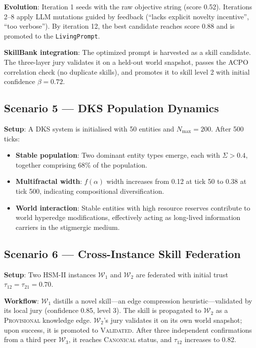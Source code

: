 \documentclass[11pt]{article}
\begin{document}
\noindent\textbf{Evolution}: Iteration 1 seeds with the raw objective string
(score 0.52). Iterations 2--8 apply LLM mutations guided by feedback
(``lacks explicit novelty incentive'', ``too verbose''). By iteration 12, the
best candidate reaches score 0.88 and is promoted to the \texttt{LivingPrompt}.

\noindent\textbf{SkillBank integration}: The optimized prompt is harvested as a
skill candidate. The three-layer jury validates it on a held-out world snapshot,
passes the ACPO correlation check (no duplicate skills), and promotes it to
skill level 2 with initial confidence $\beta = 0.72$.

\subsection{Scenario 5 --- DKS Population Dynamics}

\noindent\textbf{Setup}: A DKS system is initialised with 50 entities and
$N_{\text{max}} = 200$. After 500 ticks:

\begin{itemize}[noitemsep,topsep=4pt]
  \item \textbf{Stable population}: Two dominant entity types emerge, each with
        $\Sigma > 0.4$, together comprising 68\% of the population.
  \item \textbf{Multifractal width}: $f(\alpha)$ width increases from 0.12 at
        tick 50 to 0.38 at tick 500, indicating compositional diversification.
  \item \textbf{World interaction}: Stable entities with high resource reserves
        contribute to world hyperedge modifications, effectively acting as
        long-lived information carriers in the stigmergic medium.
\end{itemize}

\subsection{Scenario 6 --- Cross-Instance Skill Federation}

\noindent\textbf{Setup}: Two HSM-II instances $\mathcal{W}_1$ and $\mathcal{W}_2$
are federated with initial trust $\tau_{12} = \tau_{21} = 0.70$.

\noindent\textbf{Workflow}: $\mathcal{W}_1$ distills a novel skill---an edge
compression heuristic---validated by its local jury (confidence 0.85, level 3).
The skill is propagated to $\mathcal{W}_2$ as a \textsc{Provisional} knowledge
edge. $\mathcal{W}_2$'s jury validates it on its own world snapshot; upon
success, it is promoted to \textsc{Validated}. After three independent
confirmations from a third peer $\mathcal{W}_3$, it reaches \textsc{Canonical}
status, and $\tau_{12}$ increases to 0.82.
\end{document}
